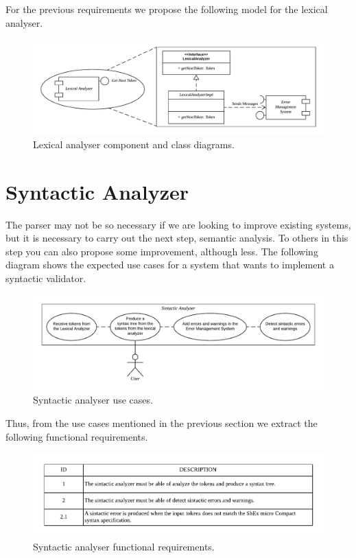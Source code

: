 For the previous requirements we propose the following model for the lexical analyser.

\begin{figure}[h!]
    \includegraphics[width=\textwidth]{images/lex-diagram.pdf}
    \centering
    \caption[Lexical analyser component and class diagrams]{Lexical analyser component and class diagrams.}
    \label{fig:lex-diag}
\end{figure}

\section{Syntactic Analyzer}
The parser may not be so necessary if we are looking to improve existing systems, but it is
necessary to carry out the next step, semantic analysis. To others
in this step you can also propose some improvement, although less. The following diagram
shows the expected use cases for a system that wants to implement a syntactic validator.

\begin{figure}[h!]
    \includegraphics[scale=0.6]{images/sin-use-case.pdf}
    \centering
    \caption[Syntactic analyser use cases]{Syntactic analyser use cases.}
    \label{fig:sin-use-case}
\end{figure}

Thus, from the use cases mentioned in the previous section we
extract the following functional requirements.

\begin{figure}[h!]
    \includegraphics[width=\textwidth]{images/sin-reqf.pdf}
    \centering
    \caption[Syntactic analyser functional requirements]{Syntactic analyser functional requirements.}
    \label{fig:sin-reqf}
\end{figure}

